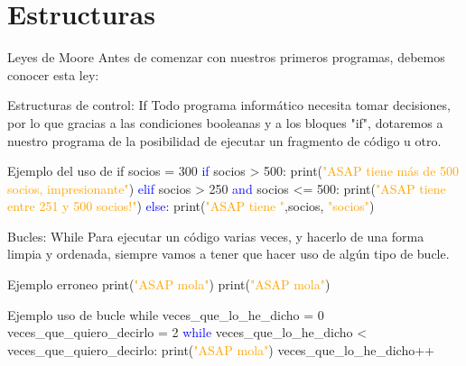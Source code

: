 \documentclass{beamer}
\begin{document}
\section{Estructuras}

\begin{frame}{Leyes de Moore}
\label{moorelaw}
Antes de comenzar con nuestros primeros programas, debemos conocer esta ley:
\end{frame}

\begin{frame}{Estructuras de control: If}
Todo programa informático necesita tomar decisiones, por lo que gracias a las condiciones booleanas y a los bloques "if", dotaremos a nuestro programa de la posibilidad de ejecutar un fragmento de código u otro.
\begin{Programexample} {Ejemplo del uso de if}
socios = 300 \newline
\textcolor{blue}{if} socios > 500:\newline
\hspace{3cm} print(\textcolor{orange}{"ASAP tiene más de 500 socios, impresionante"})\newline
\textcolor{blue}{elif} socios > 250 \textcolor{blue}{and} socios <= 500:\newline
\hspace{2cm} print(\textcolor{orange}{"ASAP tiene entre 251 y 500 socios!"})\newline
\textcolor{blue}{else}:\newline
\hspace{2cm} print(\textcolor{orange}{"ASAP tiene "},socios, \textcolor{orange}{"socios"})
\end{Programexample}
\end{frame}

\begin{frame}{Bucles: While}
Para ejecutar un código varias veces, y hacerlo de una forma limpia y ordenada, siempre vamos a tener que hacer uso de algún tipo de bucle.
\begin{Programexample}{Ejemplo erroneo}
print(\textcolor{orange}{"ASAP mola"}) \newline
print(\textcolor{orange}{"ASAP mola"})
\end{Programexample}
\begin{Programexample}{Ejemplo uso de bucle while}
veces\_que\_lo\_he\_dicho = 0 \newline
veces\_que\_quiero\_decirlo = 2 \newline
\textcolor{blue}{while} veces\_que\_lo\_he\_dicho < veces\_que\_quiero\_decirlo:
\hspace{2cm} print(\textcolor{orange}{"ASAP mola"}) \newline
\hspace{2cm} veces\_que\_lo\_he\_dicho++
\end{Programexample}
\end{frame}
\end{document}
